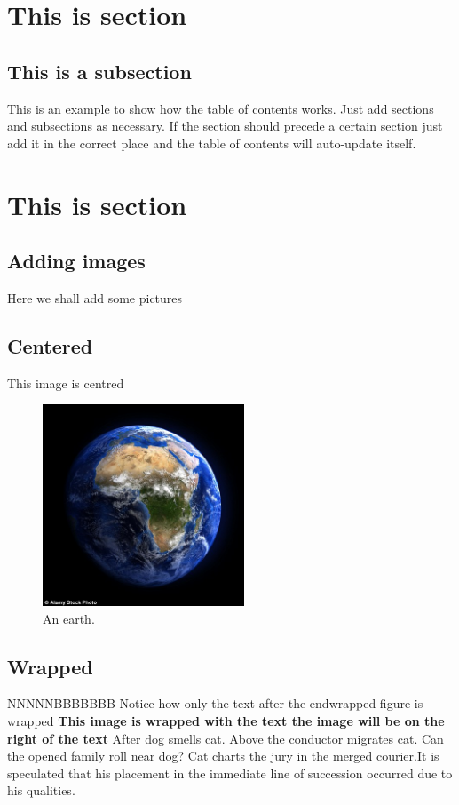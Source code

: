 \documentclass[12pt]{article}
\begin{document}
\section{This is section }
\subsection{This is a subsection}
This is an example to show how the table of contents works. Just add sections and subsections as necessary. If the section should precede a certain section just add it in the correct place and the table of contents will auto-update itself. 

 

\section{This is section }
\subsection{Adding images}
Here we shall add some pictures\\
\subsection{Centered}
This image is centred
\begin{figure}[H]
  \includegraphics[width=6cm,height=6cm]{earth.jpg}
  \centering
  \caption{An earth.}
  \label{fig:boat1}
\end{figure}

\subsection{Wrapped}
NNNNNBBBBBBB
Notice how only the text after the end{wrapped} figure is wrapped
\textbf{This image is wrapped with the text the image will be on the right of the text} 
After dog smells cat. Above the conductor migrates cat. Can the opened family roll near dog? Cat charts the jury in the merged courier.It is speculated that his placement in the immediate line of succession occurred due to his qualities.
\end{document}
